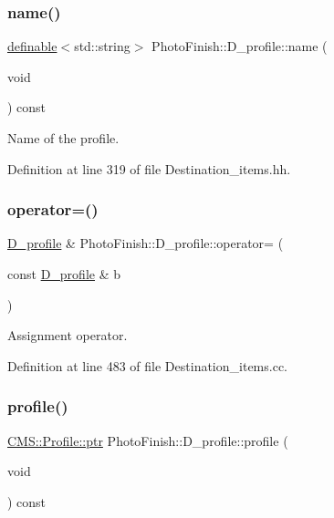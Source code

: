 \subsubsection{\texorpdfstring{name()}{name()}}
{\footnotesize\ttfamily \hyperlink{class_photo_finish_1_1definable}{definable}$<$std\+::string$>$ Photo\+Finish\+::\+D\+\_\+profile\+::name (\begin{DoxyParamCaption}\item[{void}]{ }\end{DoxyParamCaption}) const\hspace{0.3cm}{\ttfamily [inline]}}



Name of the profile. 



Definition at line 319 of file Destination\+\_\+items.\+hh.

\mbox{\label{class_photo_finish_1_1_d__profile_a04192b431fefe553190e96e74fd00600}} 
\subsubsection{\texorpdfstring{operator=()}{operator=()}}
{\footnotesize\ttfamily \hyperlink{class_photo_finish_1_1_d__profile}{D\+\_\+profile} \& Photo\+Finish\+::\+D\+\_\+profile\+::operator= (\begin{DoxyParamCaption}\item[{const \hyperlink{class_photo_finish_1_1_d__profile}{D\+\_\+profile} \&}]{b }\end{DoxyParamCaption})}



Assignment operator. 



Definition at line 483 of file Destination\+\_\+items.\+cc.

\mbox{\label{class_photo_finish_1_1_d__profile_ac8d5a87286d5c01f54401d200b1c96bf}} 
\subsubsection{\texorpdfstring{profile()}{profile()}}
{\footnotesize\ttfamily \hyperlink{class_c_m_s_1_1_profile_a7d5a80e1317d17dbfdf5ae69820ab08b}{C\+M\+S\+::\+Profile\+::ptr} Photo\+Finish\+::\+D\+\_\+profile\+::profile (\begin{DoxyParamCaption}\item[{void}]{ }\end{DoxyParamCaption}) const}



